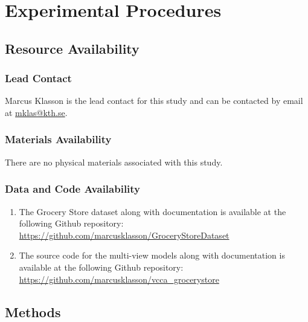 \section{Experimental Procedures}
\label{paperB:sec:experimental_procedures}

\subsection{Resource Availability}

\subsubsection{Lead Contact}
Marcus Klasson is the lead contact for this study and can be contacted by email at \url{mklas@kth.se}.

\subsubsection{Materials Availability}
There are no physical materials associated with this study.

\subsubsection{Data and Code Availability}
\begin{enumerate}
\item The Grocery Store dataset along with documentation is available at the following Github repository: \url{https://github.com/marcusklasson/GroceryStoreDataset}
\item The source code for the multi-view models along with documentation is available at the following Github repository: \url{https://github.com/marcusklasson/vcca_grocerystore}
\end{enumerate}


\subsection{Methods}\label{paperB:sec:methods}


